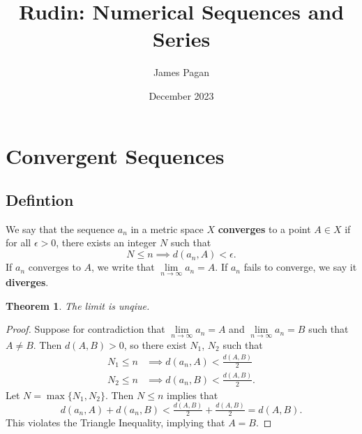\documentclass[11pt]{article}
\title{Rudin: Numerical Sequences and Series}
\author{James Pagan}
\date{December 2023}
\newtheorem{theorem}{Theorem}
\begin{document}
\maketitle
\tableofcontents
\newpage


\section{Convergent Sequences}


\subsection{Defintion}

We say that the sequence ${a_{n}}$ in a metric space $X$ \textbf{converges} to a point $A \in X$ if for all $\epsilon > 0$, there exists an integer $N$ such that
\[
	N \le n \implies d(a_{n}, A) < \epsilon.
\]
If $a_{n}$ converges to $A$, we write that $\lim\limits_{n \to \infty} a_{n} = A$. If $a_{n}$ fails to converge, we say it \textbf{diverges}.

\begin{theorem}
	The limit is unqiue.
\end{theorem}
\begin{adjustwidth}{0.5cm}{}
	\begin{proof}
		Suppose for contradiction that $\lim\limits_{n \to \infty} a_{n} = A$ and $\lim\limits_{n \to \infty} a_{n} = B$ such that $A \ne B$. Then $d(A, B) > 0$, so there exist $N_{1}$, $N_{2}$ such that
		\begin{align*}
			N_{1} \le n & \implies d(a_{n}, A) < \tfrac{d(A, B)}{2}  \\
			N_{2} \le n & \implies d(a_{n}, B) < \tfrac{d(A, B)}{2}.
		\end{align*}
		Let $N = \max \{ N_{1}, N_{2} \}$. Then $N \le n$ implies that
		\[
			d(a_{n}, A) + d(a_{n}, B) < \tfrac{d(A, B)}{2} + \tfrac{d(A, B)}{2} = d(A, B).
		\]
		This violates the Triangle Inequality, implying that $A = B$.
	\end{proof}
\end{adjustwidth}
\end{document}
